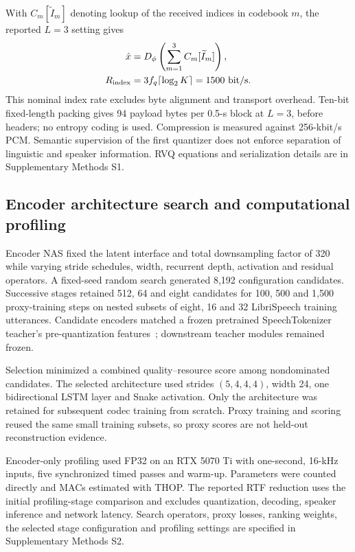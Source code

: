 \documentclass[final,5p,times,twocolumn]{elsarticle}
\begin{document}
With $C_m[\widetilde I_m]$ denoting lookup of the received indices in codebook $m$, the reported $L=3$ setting gives
\begin{equation}
\begin{aligned}
 \hat x&=D_\phi\left(\sum_{m=1}^{3}C_m[\widetilde I_m]\right),\\
 R_{\rm index}&=3f_q\lceil\log_2K\rceil=1500\ {\rm bit/s}.
\end{aligned}
\end{equation}
This nominal index rate excludes byte alignment and transport overhead. Ten-bit fixed-length packing gives 94 payload bytes per 0.5-s block at $L=3$, before headers; no entropy coding is used. Compression is measured against 256-kbit/s PCM. Semantic supervision of the first quantizer does not enforce separation of linguistic and speaker information. RVQ equations and serialization details are in Supplementary Methods S1.

\subsection{Encoder architecture search and computational profiling}
Encoder NAS fixed the latent interface and total downsampling factor of 320 while varying stride schedules, width, recurrent depth, activation and residual operators. A fixed-seed random search generated 8,192 configuration candidates. Successive stages retained 512, 64 and eight candidates for 100, 500 and 1,500 proxy-training steps on nested subsets of eight, 16 and 32 LibriSpeech training utterances. Candidate encoders matched a frozen pretrained SpeechTokenizer teacher's pre-quantization features~\cite{speechtokenizer}; downstream teacher modules remained frozen.

Selection minimized a combined quality--resource score among nondominated candidates. The selected architecture used strides $(5,4,4,4)$, width 24, one bidirectional LSTM layer and Snake activation. Only the architecture was retained for subsequent codec training from scratch. Proxy training and scoring reused the same small training subsets, so proxy scores are not held-out reconstruction evidence.

Encoder-only profiling used FP32 on an RTX 5070 Ti with one-second, 16-kHz inputs, five synchronized timed passes and warm-up. Parameters were counted directly and MACs estimated with THOP. The reported RTF reduction uses the initial profiling-stage comparison and excludes quantization, decoding, speaker inference and network latency. Search operators, proxy losses, ranking weights, the selected stage configuration and profiling settings are specified in Supplementary Methods S2.
\end{document}
